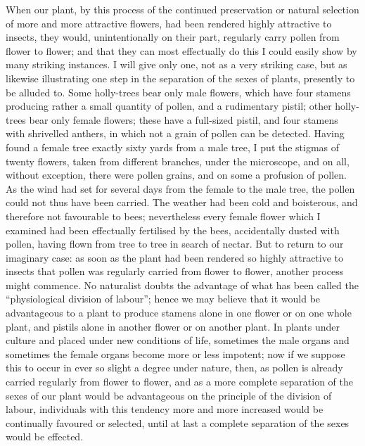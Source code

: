 \darwinpair
{When our plant, by this process of the continued preservation or natural selection of more and more attractive flowers, had been rendered highly attractive to insects, they would, unintentionally on their part, regularly carry pollen from flower to flower; and that they can most effectually do this I could easily show by many striking instances. I will give only one, not as a very striking case, but as likewise illustrating one step in the separation of the sexes of plants, presently to be alluded to. Some holly-trees bear only male flowers, which have four stamens producing rather a small quantity of pollen, and a rudimentary pistil; other holly-trees bear only female flowers; these have a full-sized pistil, and four stamens with shrivelled anthers, in which not a grain of pollen can be detected. Having found a female tree exactly sixty yards from a male tree, I put the stigmas of twenty flowers, taken from different branches, under the microscope, and on all, without exception, there were pollen grains, and on some a profusion of pollen. As the wind had set for several days from the female to the male tree, the pollen could not thus have been carried. The weather had been cold and boisterous, and therefore not favourable to bees; nevertheless every female flower which I examined had been effectually fertilised by the bees, accidentally dusted with pollen, having flown from tree to tree in search of nectar. But to return to our imaginary case: as soon as the plant had been rendered so highly attractive to insects that pollen was regularly carried from flower to flower, another process might commence. No naturalist doubts the advantage of what has been called the “physiological division of labour”; hence we may believe that it would be advantageous to a plant to produce stamens alone in one flower or on one whole plant, and pistils alone in another flower or on another plant. In plants under culture and placed under new conditions of life, sometimes the male organs and sometimes the female organs become more or less impotent; now if we suppose this to occur in ever so slight a degree under nature, then, as pollen is already carried regularly from flower to flower, and as a more complete separation of the sexes of our plant would be advantageous on the principle of the division of labour, individuals with this tendency more and more increased would be continually favoured or selected, until at last a complete separation of the sexes would be effected.}
